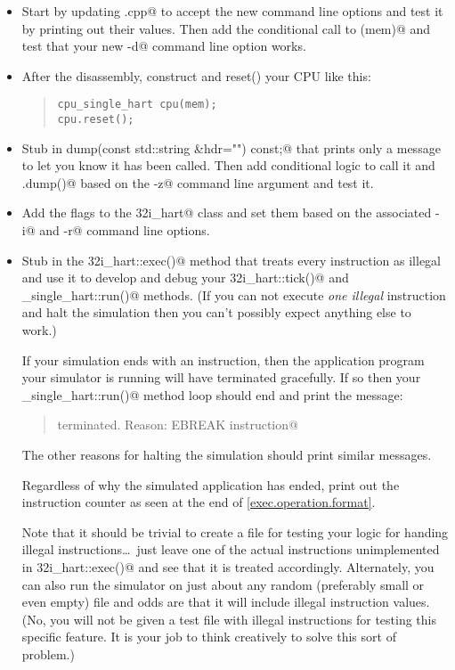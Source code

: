 \documentclass{article}
\begin{document}
\begin{itemize}
\item
Start by updating \verb@main.cpp@ to accept the new command line options 
and test it by printing out their values.  Then add the conditional call to
\verb@disassemble(mem)@ and test that your new \verb@-d@ command line option
works.

\item 
After the disassembly, construct and reset() your CPU like this:

\begin{quote}
\begin{verbatim}
cpu_single_hart cpu(mem);
cpu.reset();
\end{verbatim}
\end{quote}

 
\item
Stub in \verb@void dump(const std::string &hdr="") const;@ that prints only a 
message to let you know it has been called.
Then add conditional logic to call it and \verb@mem.dump()@ based on
the \verb@-z@ command line argument and test it.

\item 
Add the flags to the \verb@rv32i_hart@ class and set them based on the 
associated \verb@-i@ and \verb@-r@ command line options.

\item
Stub in the \verb@rv32i_hart::exec()@ method that treats every instruction as illegal
and use it to develop and debug your \verb@rv32i_hart::tick()@ and \verb@cpu_single_hart::run()@
methods. (If you can not execute {\em one illegal} instruction and halt
the simulation then you can't possibly expect anything else to work.)

If your simulation ends with an \verb@ebreak@ instruction, then the application
program your simulator is running will have terminated gracefully.  If so then
your \verb@cpu_single_hart::run()@ method loop should end and print the message:

\begin{quote}
\verb@Execution terminated. Reason: EBREAK instruction@
\end{quote}

The other reasons for halting the simulation should print similar messages.

Regardless of why the simulated application has ended, print out the instruction
counter as seen at the end of \autoref{exec.operation.format}.

Note that it should be trivial to create a file for testing your logic for handing 
illegal instructions\ldots\ just
leave one of the actual instructions unimplemented in \verb@rv32i_hart::exec()@ and
see that it is treated accordingly.  Alternately, you can also run the 
simulator on just about any random (preferably small or even empty) file 
and odds are that it will include illegal instruction values.  (No, you 
will not be given a test file with illegal instructions for testing this 
specific feature.  It is your job to think creatively to solve this sort of problem.)


\end{itemize}
\end{document}
